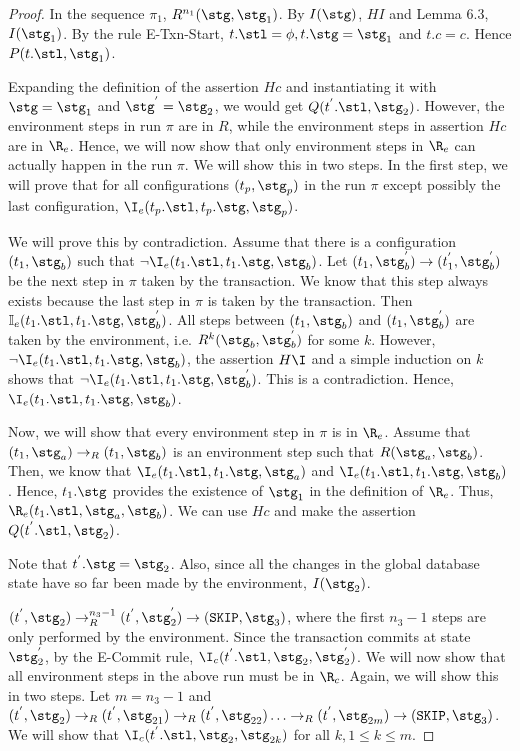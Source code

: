 \begin{proof}
In the sequence $\pi_1$, $R^{n_1}(\stg, \stg_1)$. By $I(\stg)$, $HI$ and Lemma 6.3, $I(\stg_1)$. By the rule E-Txn-Start, $t.\stl = \phi, t.\stg = \stg_1$ and $t.c = c$. Hence $P(t.\stl, \stg_1)$.

Expanding the definition of the assertion $Hc$ and instantiating it with $\stg = \stg_1$ and $\stg^{'} = \stg_2$, we would get $Q(t^{'}.\stl, \stg_2)$. However, the environment steps in run $\pi$ are in $R$, while the environment steps in assertion $Hc$ are in $\R_e$. Hence, we will now show that only environment steps in $\R_e$ can actually happen in the run $\pi$. We will show this in two steps. In the first step, we will prove that for all configurations $(t_p, \stg_p)$ in the run $\pi$ except possibly the last configuration, $\I_e(t_p.\stl, t_p.\stg, \stg_p)$. 

We will prove this by contradiction. Assume that there is a configuration $(t_1, \stg_b)$ such that $\neg \I_e( t_1.\stl, t_1.\stg, \stg_b)$. Let $(t_1, \stg_{b}^{'}) \rightarrow (t_{1}^{'}, \stg_{b}^{'})$ be the next step in $\pi$ taken by the transaction. We know that this step always exists because the last step in $\pi$ is taken by the transaction.  Then $\mathbb{I}_e(t_1.\stl, t_1.\stg, \stg_{b}^{'})$. All steps between $(t_1, \stg_b)$ and $(t_1, \stg_{b}^{'})$ are taken by the environment, i.e. $R^{k}(\stg_b, \stg_{b}^{'})$ for some $k$. However,  $\neg \I_e(t_1.\stl, t_1.\stg, \stg_b)$, the assertion $H\I$ and a simple induction on $k$ shows that $\neg \I_e(t_1.\stl, t_1.\stg, \stg_{b}^{'})$. This is a contradiction. Hence, $\I_e(t_1.\stl, t_1.\stg, \stg_b)$. 

Now, we will show that every environment step in $\pi$ is in $\R_e$. Assume that $(t_1, \stg_a) \rightarrow_R (t_1, \stg_b)$ is an environment step such that $R(\stg_a, \stg_b)$. Then, we know that $\I_e(t_1.\stl, t_1.\stg, \stg_a)$ and $\I_e(t_1.\stl, t_1.\stg, \stg_b)$. Hence, $t_1.\stg$ provides the existence of $\stg_1$ in the definition of $\R_e$. Thus, $\R_e(t_1.\stl, \stg_a, \stg_b)$. We can use $Hc$ and make the assertion $Q(t^{'}.\stl, \stg_2)$.

Note that $t^{'}.\stg = \stg_2$. Also, since all the changes in the global database state have so far been made by the environment, $I(\stg_2)$.

$(t^{'}, \stg_2) \rightarrow_{R}^{n_3 - 1} (t^{'}, \stg_{2}^{'}) \rightarrow (\texttt{SKIP}, \stg_3)$, where the first $n_3-1$ steps are only performed by the environment. Since the transaction commits at state $\stg_{2}^{'}$, by the E-Commit rule, $\I_c(t^{'}.\stl, \stg_2, \stg_{2}^{'})$. We will now show that all environment steps in the above run must be in $\R_c$. Again, we will show this in two steps. Let $m = n_3 - 1$ and $(t^{'}, \stg_2) \rightarrow_R (t^{'}, \stg_{21}) \rightarrow_R (t^{'}, \stg_{22}) \ldots \rightarrow_R (t^{'}, \stg_{2m}) \rightarrow (\texttt{SKIP}, \stg_3)$. We will show that $\I_c(t^{'}.\stl, \stg_2, \stg_{2k})$ for all $k, 1 \leq k \leq m$. 


\end{proof}
